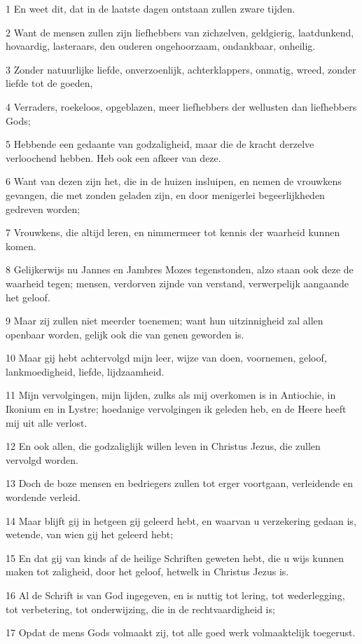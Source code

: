\par 1 En weet dit, dat in de laatste dagen ontstaan zullen zware tijden.
\par 2 Want de mensen zullen zijn liefhebbers van zichzelven, geldgierig, laatdunkend, hovaardig, lasteraars, den ouderen ongehoorzaam, ondankbaar, onheilig.
\par 3 Zonder natuurlijke liefde, onverzoenlijk, achterklappers, onmatig, wreed, zonder liefde tot de goeden,
\par 4 Verraders, roekeloos, opgeblazen, meer liefhebbers der wellusten dan liefhebbers Gods;
\par 5 Hebbende een gedaante van godzaligheid, maar die de kracht derzelve verloochend hebben. Heb ook een afkeer van deze.
\par 6 Want van dezen zijn het, die in de huizen insluipen, en nemen de vrouwkens gevangen, die met zonden geladen zijn, en door menigerlei begeerlijkheden gedreven worden;
\par 7 Vrouwkens, die altijd leren, en nimmermeer tot kennis der waarheid kunnen komen.
\par 8 Gelijkerwijs nu Jannes en Jambres Mozes tegenstonden, alzo staan ook deze de waarheid tegen; mensen, verdorven zijnde van verstand, verwerpelijk aangaande het geloof.
\par 9 Maar zij zullen niet meerder toenemen; want hun uitzinnigheid zal allen openbaar worden, gelijk ook die van genen geworden is.
\par 10 Maar gij hebt achtervolgd mijn leer, wijze van doen, voornemen, geloof, lankmoedigheid, liefde, lijdzaamheid.
\par 11 Mijn vervolgingen, mijn lijden, zulks als mij overkomen is in Antiochie, in Ikonium en in Lystre; hoedanige vervolgingen ik geleden heb, en de Heere heeft mij uit alle verlost.
\par 12 En ook allen, die godzaliglijk willen leven in Christus Jezus, die zullen vervolgd worden.
\par 13 Doch de boze mensen en bedriegers zullen tot erger voortgaan, verleidende en wordende verleid.
\par 14 Maar blijft gij in hetgeen gij geleerd hebt, en waarvan u verzekering gedaan is, wetende, van wien gij het geleerd hebt;
\par 15 En dat gij van kinds af de heilige Schriften geweten hebt, die u wijs kunnen maken tot zaligheid, door het geloof, hetwelk in Christus Jezus is.
\par 16 Al de Schrift is van God ingegeven, en is nuttig tot lering, tot wederlegging, tot verbetering, tot onderwijzing, die in de rechtvaardigheid is;
\par 17 Opdat de mens Gods volmaakt zij, tot alle goed werk volmaaktelijk toegerust.

